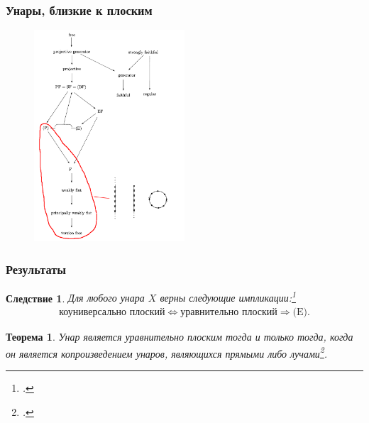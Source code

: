 \documentclass[11pt, notheorems]{beamer}
\newtheorem{theorem}{Теорема}
\newtheorem{corollary}{Следствие}
\begin{document}
\begin{frame}
	\frametitle{Унары, близкие к плоским}

	\begin{figure}
		\center
		\includegraphics[width=0.5\textwidth]{overview_3.png}
	\end{figure}
\end{frame}

\begin{frame}
	\frametitle{Результаты}

	\begin{corollary}
		Для любого унара $X$ верны следующие импликации:\footcite[следствие 4]{pryan:unars_close_to_flat}
		\begin{gather*}
			\text{коуниверсально плоский} \Leftrightarrow \text{уравнительно плоский} \Rightarrow \text{(E)}.
		\end{gather*}
	\end{corollary}

	\begin{theorem}
		Унар является уравнительно плоским тогда и только тогда, когда он является копроизведением унаров, являющихся прямыми либо лучами\footcite[теорема 3]{pryan:unars_close_to_flat}.
	\end{theorem}
\end{frame}
\end{document}
